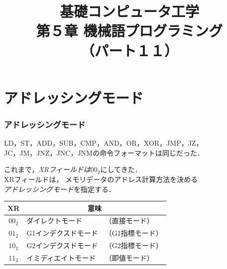 \documentclass{beamer}                 %
\begin{document}
\title{基礎コンピュータ工学\\第５章 機械語プログラミング\\（パート１１）}
\date{}

\begin{frame}
  \titlepage
\end{frame}


\section{アドレッシングモード}
\begin{frame}
  \frametitle{アドレッシングモード}
  LD，ST，ADD，SUB，CMP，AND，OR，XOR，JMP，JZ，\\
  JC，JM，JNZ，JNC，JNMの命令フォーマットは同じだった．
  \twoByte{\OP}{\GR~\XR}{\A}

  これまで，\emph{XRフィールドは$00_2$}にしてきた．\\
  XRフィールドは，
  メモリデータのアドレス計算方法を決める\\
  \emph{アドレッシングモード}を指定する．\\

  {\small\begin{center}
    \begin{tabular}{c|l l}
      \hline
      \hline
      XR & \multicolumn{2}{|c}{意味} \\
      \hline
      $00_2$ & ダイレクトモード     & （直接モード）   \\
      $01_2$ & G1インデクスドモード & （G1指標モード） \\
      $10_2$ & G2インデクスドモード & （G2指標モード） \\
      $11_2$ & イミディエイトモード & （即値モード）   \\
    \end{tabular}
  \end{center}}
  \vfill
  \vfill
\end{frame}
\end{document}
